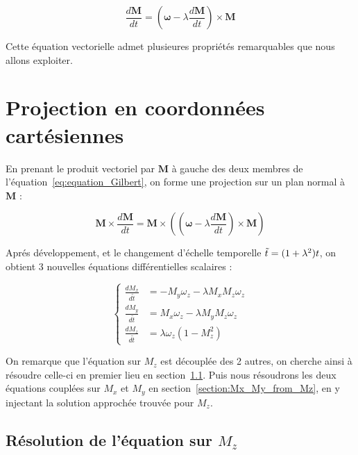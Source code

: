 \documentclass[12pt]{report}
\begin{document}
\begin{equation}
    \frac{d\bm{M}}{dt} = (\bm{\omega}-\lambda \frac{d{\bm{M}}}{dt})\times\bm{M}
    \label{eq:equation_Gilbert}
\end{equation}

Cette équation vectorielle admet plusieures propriétés remarquables que nous allons exploiter.

\section{Projection en coordonnées cartésiennes}
\label{sec:projection_cartesiennes}

En prenant le produit vectoriel par $\bm M$ à gauche des deux membres de l'équation~\ref{eq:equation_Gilbert}, on forme une projection sur un plan normal à $\bm{M}$ :

\begin{equation}
    \bm{M}\times\frac{d\bm{M}}{dt} = \bm{M}\times((\bm{\omega}-\lambda \frac{d{\bm{M}}}{dt})\times\bm{M} )
    \label{eq:equation_Gilbert_produit_vectoriel}
\end{equation}

Aprés développement, et le changement d'échelle temporelle $\Tilde{t} = (1+\lambda^2)t$, on obtient 3 nouvelles équations différentielles scalaires :

\begin{equation}
    \left\{
    \begin{aligned}
        \frac{dM_x}{d\tilde{t}} & = - M_y\omega_z - \lambda M_x M_z \omega_z \\
        \frac{dM_y}{d\tilde{t}} & = M_x\omega_z - \lambda M_y M_z \omega_z   \\
        \frac{dM_z}{d\tilde{t}} & = \lambda\omega_z (1-M_z^2)
    \end{aligned}
    \right.
    \label{eq:equations_scalaires_Gilbert}
\end{equation}

On remarque que l'équation sur $M_z$ est découplée des 2 autres, on cherche ainsi à résoudre celle-ci en premier lieu en section~\ref{section:Mz}. Puis nous résoudrons les deux équations couplées sur $M_x$ et $M_y$ en section~\ref{section:Mx_My_from_Mz}, en y injectant la solution approchée trouvée pour $M_z$.

\subsection{Résolution de l'équation sur $M_z$}
\label{section:Mz}
\end{document}
